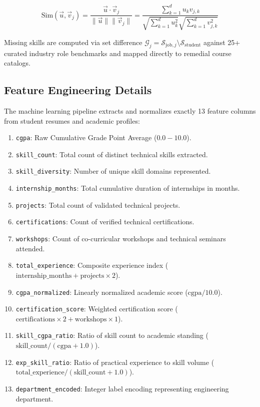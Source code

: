 \documentclass[12pt,a4paper]{report}
\begin{document}
\begin{equation}
    \text{Sim}(\vec{u}, \vec{v}_j) = \frac{\vec{u} \cdot \vec{v}_j}{\|\vec{u}\| \|\vec{v}_j\|} = \frac{\sum_{k=1}^d u_k v_{j,k}}{\sqrt{\sum_{k=1}^d u_k^2} \sqrt{\sum_{k=1}^d v_{j,k}^2}}
\end{equation}

\noindent Missing skills are computed via set difference $\mathcal{G}_j = \mathcal{S}_{\text{job}, j} \setminus \mathcal{S}_{\text{student}}$ against 25+ curated industry role benchmarks and mapped directly to remedial course catalogs.

\subsection{Feature Engineering Details}
The machine learning pipeline extracts and normalizes exactly 13 feature columns from student resumes and academic profiles:
\begin{enumerate}
    \item \texttt{cgpa}: Raw Cumulative Grade Point Average ($0.0 - 10.0$).
    \item \texttt{skill\_count}: Total count of distinct technical skills extracted.
    \item \texttt{skill\_diversity}: Number of unique skill domains represented.
    \item \texttt{internship\_months}: Total cumulative duration of internships in months.
    \item \texttt{projects}: Total count of validated technical projects.
    \item \texttt{certifications}: Count of verified technical certifications.
    \item \texttt{workshops}: Count of co-curricular workshops and technical seminars attended.
    \item \texttt{total\_experience}: Composite experience index ($\text{internship\_months} + \text{projects} \times 2$).
    \item \texttt{cgpa\_normalized}: Linearly normalized academic score ($\text{cgpa} / 10.0$).
    \item \texttt{certification\_score}: Weighted certification score ($\text{certifications} \times 2 + \text{workshops} \times 1$).
    \item \texttt{skill\_cgpa\_ratio}: Ratio of skill count to academic standing ($\text{skill\_count} / (\text{cgpa} + 1.0)$).
    \item \texttt{exp\_skill\_ratio}: Ratio of practical experience to skill volume ($\text{total\_experience} / (\text{skill\_count} + 1.0)$).
    \item \texttt{department\_encoded}: Integer label encoding representing engineering department.
\end{enumerate}
\end{document}
